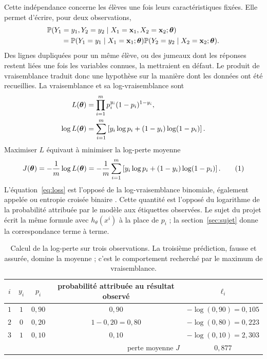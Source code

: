 Cette indépendance concerne les élèves une fois leurs caractéristiques fixées.
Elle permet d'écrire, pour deux observations,
\begin{align*}
  &\mathbb{P}(Y_1=y_1,Y_2=y_2\mid X_1=\mathbf{x}_1,X_2=\mathbf{x}_2;\boldsymbol{\theta})\\
  &\qquad=\mathbb{P}(Y_1=y_1\mid X_1=\mathbf{x}_1;\boldsymbol{\theta})
   \mathbb{P}(Y_2=y_2\mid X_2=\mathbf{x}_2;\boldsymbol{\theta}).
\end{align*}
Des lignes dupliquées pour un même élève, ou des jumeaux dont les réponses restent
liées une fois les variables connues, la mettraient en défaut. Le produit de
vraisemblance traduit donc une hypothèse sur la manière dont les données ont été
recueillies.
La vraisemblance et sa log-vraisemblance sont
\begin{align*}
  L(\boldsymbol{\theta})&=\prod_{i=1}^m p_i^{y_i}(1-p_i)^{1-y_i},\\
  \log L(\boldsymbol{\theta})&=\sum_{i=1}^m
  \left[y_i\log p_i+(1-y_i)\log(1-p_i)\right].
\end{align*}
Maximiser $L$ équivaut à minimiser la log-perte moyenne
\[
  J(\boldsymbol{\theta})=-\frac1m\log L(\boldsymbol{\theta})
  =-\frac1m\sum_{i=1}^m\left[y_i\log p_i+
  (1-y_i)\log(1-p_i)\right].
  \tag{1}\label{eq:loss}
\]
L'équation~\eqref{eq:loss} est l'opposé de la log-vraisemblance binomiale,
également appelée  ou entropie croisée binaire
\cite[équations~4.19--4.20]{hastie2009}.
Cette quantité est l'opposé du logarithme de la probabilité attribuée par le
modèle aux étiquettes observées. Le sujet du projet écrit la même formule avec
$h_\theta(x^i)$ à la place de $p_i$ ; la section~\ref{sec:sujet} donne la
correspondance terme à terme.

\begin{table}[htbp]
\centering
\begin{tabular}{ccccc}
\toprule
$i$ & $y_i$ & $p_i$ & probabilité attribuée au résultat observé & $\ell_i$ \\
\midrule
$1$ & $1$ & $0{,}90$ & $0{,}90$ & $-\log(0{,}90)=0{,}105$ \\
$2$ & $0$ & $0{,}20$ & $1-0{,}20=0{,}80$ & $-\log(0{,}80)=0{,}223$ \\
$3$ & $1$ & $0{,}10$ & $0{,}10$ & $-\log(0{,}10)=2{,}303$ \\
\midrule
\multicolumn{4}{r}{perte moyenne $J$} & $0{,}877$ \\
\bottomrule
\end{tabular}
\caption{Calcul de la log-perte sur trois observations. La troisième prédiction,
fausse et assurée, domine la moyenne ; c'est le comportement recherché par le
maximum de vraisemblance.}
\label{tab:loss-example}
\end{table}


